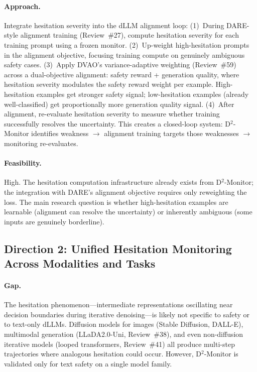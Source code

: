 \documentclass[11pt,a4paper]{article}
\begin{document}
\paragraph{Approach.}
Integrate hesitation severity into the dLLM alignment loop: (1)~During DARE-style alignment training (Review~\#27), compute hesitation severity for each training prompt using a frozen monitor. (2)~Up-weight high-hesitation prompts in the alignment objective, focusing training compute on genuinely ambiguous safety cases. (3)~Apply DVAO's variance-adaptive weighting (Review~\#59) across a dual-objective alignment: safety reward + generation quality, where hesitation severity modulates the safety reward weight per example. High-hesitation examples get stronger safety signal; low-hesitation examples (already well-classified) get proportionally more generation quality signal. (4)~After alignment, re-evaluate hesitation severity to measure whether training successfully resolves the uncertainty. This creates a closed-loop system: D$^2$-Monitor identifies weakness $\to$ alignment training targets those weaknesses $\to$ monitoring re-evaluates.

\paragraph{Feasibility.}
High. The hesitation computation infrastructure already exists from D$^2$-Monitor; the integration with DARE's alignment objective requires only reweighting the loss. The main research question is whether high-hesitation examples are learnable (alignment can resolve the uncertainty) or inherently ambiguous (some inputs are genuinely borderline).

\subsection*{Direction 2: Unified Hesitation Monitoring Across Modalities and Tasks}

\paragraph{Gap.}
The hesitation phenomenon---intermediate representations oscillating near decision boundaries during iterative denoising---is likely not specific to safety or to text-only dLLMs. Diffusion models for images (Stable Diffusion, DALL-E), multimodal generation (LLaDA2.0-Uni, Review~\#38), and even non-diffusion iterative models (looped transformers, Review~\#41) all produce multi-step trajectories where analogous hesitation could occur. However, D$^2$-Monitor is validated only for text safety on a single model family.
\end{document}
